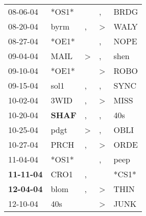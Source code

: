 \begin{supertabular}{p{0.07\textwidth}p{0.06\textwidth}p{0.02\textwidth}p{0.02\textwidth}p{0.06\textwidth}}
          08-06-04\textsuperscript{} &                            *OS1* &                  &                , &           BRDG\textsuperscript{} \\
          08-20-04\textsuperscript{} &           byrm\textsuperscript{} &                , &     \textgreater &           WALY\textsuperscript{} \\
          08-27-04\textsuperscript{} &                            *OE1* &                  &                , &           NOPE\textsuperscript{} \\
          09-04-04\textsuperscript{} &           MAIL\textsuperscript{} &     \textgreater &                , &           shen\textsuperscript{} \\
          09-10-04\textsuperscript{} &                            *OE1* &                  &     \textgreater &           ROBO\textsuperscript{} \\
          09-15-04\textsuperscript{} &           sol1\textsuperscript{} &                , &                , &           SYNC\textsuperscript{} \\
          10-02-04\textsuperscript{} &           3WID\textsuperscript{} &                , &     \textgreater &           MISS\textsuperscript{} \\
          10-20-04\textsuperscript{} &  \textbf{SHAF\textsuperscript{}} &                , &                , &            40s\textsuperscript{} \\
          10-25-04\textsuperscript{} &           pdgt\textsuperscript{} &     \textgreater &                , &           OBLI\textsuperscript{} \\
          10-27-04\textsuperscript{} &           PRCH\textsuperscript{} &                , &     \textgreater &           ORDE\textsuperscript{} \\
          11-04-04\textsuperscript{} &                            *OS1* &                  &                , &           peep\textsuperscript{} \\
 \textbf{11-11-04\textsuperscript{}} &           CRO1\textsuperscript{} &                , &                  &                            *CS1* \\
 \textbf{12-04-04\textsuperscript{}} &           blom\textsuperscript{} &                , &     \textgreater &           THIN\textsuperscript{} \\
          12-10-04\textsuperscript{} &            40s\textsuperscript{} &                  &     \textgreater &           JUNK\textsuperscript{} \\

\end{supertabular}

